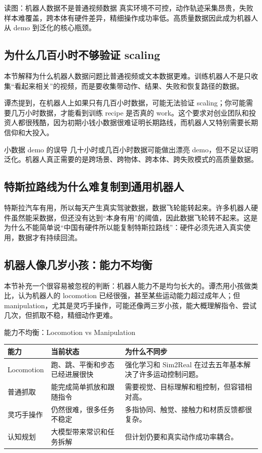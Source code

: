 \documentclass[a4paper]{article}
\begin{document}
\begin{knowledgebox}{读图：机器人数据不是普通视频数据}
真实环境不可控，动作轨迹采集昂贵，失败样本难覆盖，跨本体有硬件差异，精细操作成功率低。高质量数据因此成为机器人从 demo 到泛化的核心瓶颈。
\end{knowledgebox}

\subsection{为什么几百小时不够验证 scaling}

本节解释为什么机器人数据问题比普通视频或文本数据更难。训练机器人不是只收集“看起来相关”的视频，而是要收集带动作、结果、失败和恢复路径的数据。

谭杰提到，在机器人上如果只有几百小时数据，可能无法验证 scaling；你可能需要几万小时数据，才能看到训练 recipe 是否真的 work。这个要求对创业团队和投资人都很残酷，因为初期小钱小数据很难证明长期路线，而机器人又特别需要长期信仰和大投入。

\begin{warningbox}{小数据 demo 的误导}
几十小时或几百小时数据可能做出漂亮 demo，但不足以证明泛化。机器人真正需要的是跨场景、跨物体、跨本体、跨失败模式的高质量数据。
\end{warningbox}

\subsection{特斯拉路线为什么难复制到通用机器人}

特斯拉汽车有用，所以每天产生真实驾驶数据，数据飞轮能转起来。许多机器人硬件虽然能采数据，但还没有达到“本身有用”的阈值，因此数据飞轮转不起来。这是为什么不能简单说“中国有硬件所以能复制特斯拉路线”：硬件必须先进入真实使用，数据才有持续回流。

\subsection{机器人像几岁小孩：能力不均衡}

本节补充一个很容易被忽视的判断：机器人能力不是均匀长大的。谭杰用小孩做类比，认为机器人的 locomotion 已经很强，甚至某些运动能力超过成年人；但 manipulation，尤其是灵巧手操作，可能还像两三岁小孩，能大概理解指令、尝试几次，但抓取不稳，精细动作更难。

\begin{knowledgebox}{能力不均衡：Locomotion vs Manipulation}
\begin{tabularx}{\textwidth}{p{}p{}X}
\toprule
能力 & 当前状态 & 为什么不同步 \\
\midrule
Locomotion & 跑、跳、平衡和步态已经进展很快 & 强化学习和 Sim2Real 在过去五年基本解决了许多运动控制问题。 \\
普通抓取 & 能完成简单抓放和跟随指令 & 需要视觉、目标理解和粗控制，但容错相对高。 \\
灵巧手操作 & 仍然很难，很多任务不稳定 & 多指协同、触觉、接触力和材质反馈都很复杂。 \\
认知规划 & 大模型带来常识和任务拆解 & 但计划仍要和真实动作成功率耦合。 \\
\bottomrule
\end{tabularx}
\end{knowledgebox}
\end{document}
